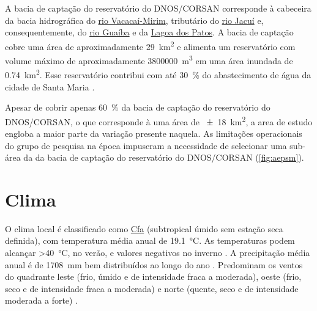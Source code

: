 
A bacia de captação do reservatório do DNOS/CORSAN corresponde à cabeceira da bacia hidrográfica do 
\href{http://pt.wikipedia.org/wiki/Rio_Vacaca\%C3\%AD-Mirim}{rio Vacacaí-Mirim}, tributário do 
\href{http://pt.wikipedia.org/wiki/Rio_Jacu\%C3\%AD}{rio Jacuí} e, consequentemente, do 
\href{http://pt.wikipedia.org/wiki/Lago_Gua\%C3\%ADba}{rio Guaíba} e da 
\href{http://pt.wikipedia.org/wiki/Lagoa_dos_Patos}{Lagoa dos Patos}. A bacia de captação cobre uma 
área de aproximadamente \SI{29}{\square\kilo\metre} e alimenta um reservatório com volume máximo 
de aproximadamente \SI{3800000}{\cubic\metre} em uma área inundada de \SI{0,74}{\square\kilo\metre}.
Esse reservatório contribui com até \SI{30}{\percent} do abastecimento de água da cidade de Santa 
Maria \cite{Dias2003, DillEtAl2004, Miguel2010}.

Apesar de cobrir apenas \SI{60}{\percent} da bacia de captação do reservatório do DNOS/CORSAN, o 
que corresponde à uma área de \SI{\pm18}{\square\kilo\metre}, a area de estudo engloba a maior parte 
da variação presente naquela. As limitações operacionais do grupo de pesquisa na época impuseram a 
necessidade de selecionar uma sub-área da da bacia de captação do reservatório do DNOS/CORSAN 
(\autoref{fig:aepsm}).


\tocless\section{Clima}

O clima local é classificado como \href{http://pt.wikipedia.org/wiki/Clima_subtropical_\%C3\%BAmido}{Cfa}
(subtropical úmido sem estação seca definida), com temperatura média anual de \SI{19,1}{\celsius}. 
As temperaturas podem alcançar \SI{>40}{\celsius}, no verão, e valores negativos no inverno 
\cite{HeldweinEtAl2009}. A precipitação média anual é de \SI{1708}{\milli\metre} bem distribuídos 
ao longo do ano \cite{Maluf2000}. Predominam os ventos do quadrante leste (frio, úmido e de 
intensidade fraca a moderada), oeste (frio, seco e de intensidade fraca a moderada) e norte (quente,
seco e de intensidade moderada a forte) \cite{HeldweinEtAl2009}.

